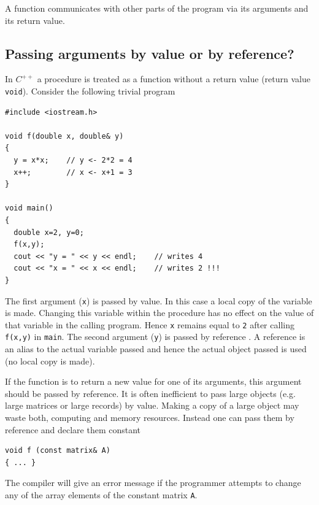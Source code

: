 A function communicates with other parts of the program via its arguments and
its return value.


\subsection{Passing arguments by value or by reference? \label{secPassRef}}

In $C^{++}$ a procedure  is treated as a function 
without a return value (return value \verb+void+). Consider the following trivial
program
{\small \begin{verbatim}
#include <iostream.h>

void f(double x, double& y)
{
  y = x*x;    // y <- 2*2 = 4
  x++;        // x <- x+1 = 3
}

void main()
{
  double x=2, y=0;
  f(x,y);
  cout << "y = " << y << endl;    // writes 4
  cout << "x = " << x << endl;    // writes 2 !!!
}
\end{verbatim}}
\noindent
The first argument (\verb+x+) is passed by value. In this case a local copy of the
variable is made. Changing this variable within the procedure has no effect on the value
of that variable in the calling program. Hence \verb+x+ remains equal to \verb+2+
after calling \verb+f(x,y)+ in \verb+main+. The second argument (\verb+y+) is passed
by reference . A reference is an alias to the actual
variable passed and hence the actual object passed is used (no local copy is made).

If the function is to return a new value for one of its arguments, this argument should
be passed by reference. It is often inefficient
to pass large objects (e.g. large matrices or large records) by value. Making
a copy of a large object may waste both, computing and memory resources.
Instead one can pass them by reference and declare them constant 
{\small \begin{verbatim}
void f (const matrix& A)
{ ... }
\end{verbatim}}
\noindent
The compiler will give an error message if the programmer attempts to change
any of the array elements of the constant matrix \verb+A+.


